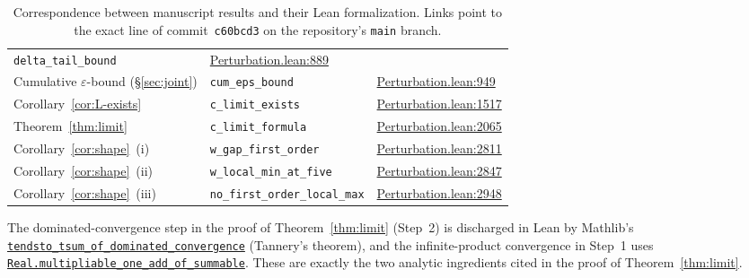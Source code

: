 \documentclass[reqno,final,11pt]{amsart}
\theoremstyle{plain}
\theoremstyle{definition}
\theoremstyle{remark}
\begin{document}
\begin{table}[h]
\begin{tabular}{@{}lll@{}}
  \texttt{delta\_tail\_bound} &
  \href{https://github.com/pfaffelh/coins/blob/c60bcd3/CoinsLean/CoinsLean/Perturbation.lean\#L889}{Perturbation.lean:889} \\
Cumulative $\varepsilon$-bound (\S\ref{sec:joint}) &
  \texttt{cum\_eps\_bound} &
  \href{https://github.com/pfaffelh/coins/blob/c60bcd3/CoinsLean/CoinsLean/Perturbation.lean\#L949}{Perturbation.lean:949} \\
Corollary~\ref{cor:L-exists} &
  \texttt{c\_limit\_exists} &
  \href{https://github.com/pfaffelh/coins/blob/c60bcd3/CoinsLean/CoinsLean/Perturbation.lean\#L1517}{Perturbation.lean:1517} \\
Theorem~\ref{thm:limit} &
  \texttt{c\_limit\_formula} &
  \href{https://github.com/pfaffelh/coins/blob/c60bcd3/CoinsLean/CoinsLean/Perturbation.lean\#L2065}{Perturbation.lean:2065} \\
Corollary~\ref{cor:shape}~(i) &
  \texttt{w\_gap\_first\_order} &
  \href{https://github.com/pfaffelh/coins/blob/c60bcd3/CoinsLean/CoinsLean/Perturbation.lean\#L2811}{Perturbation.lean:2811} \\
Corollary~\ref{cor:shape}~(ii) &
  \texttt{w\_local\_min\_at\_five} &
  \href{https://github.com/pfaffelh/coins/blob/c60bcd3/CoinsLean/CoinsLean/Perturbation.lean\#L2847}{Perturbation.lean:2847} \\
Corollary~\ref{cor:shape}~(iii) &
  \texttt{no\_first\_order\_local\_max} &
  \href{https://github.com/pfaffelh/coins/blob/c60bcd3/CoinsLean/CoinsLean/Perturbation.lean\#L2948}{Perturbation.lean:2948} \\
\hline
\end{tabular}
\caption{Correspondence between manuscript results and their Lean
  formalization.  Links point to the exact line of
  commit~\texttt{c60bcd3} on the repository's
  \texttt{main} branch.}\label{tab:lean-map}
\end{table}

The dominated-convergence step in the proof of
Theorem~\ref{thm:limit} (Step~2) is discharged in Lean by
Mathlib's \href{https://leanprover-community.github.io/mathlib4_docs/Mathlib/Analysis/Normed/Group/Tannery.html}{\texttt{tendsto\_tsum\_of\_dominated\_convergence}}
(Tannery's theorem), and the infinite-product convergence in
Step~1 uses
\href{https://leanprover-community.github.io/mathlib4_docs/Mathlib/Analysis/SpecificLimits/Normed.html}{\texttt{Real.multipliable\_one\_add\_of\_summable}}.
These are exactly the two analytic ingredients cited in the proof
of Theorem~\ref{thm:limit}.
\end{document}
